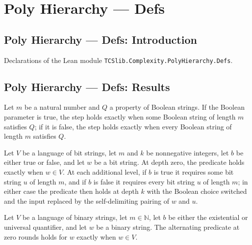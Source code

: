\section{Poly Hierarchy --- Defs}
\subsection*{Poly Hierarchy --- Defs: Introduction}

Declarations of the Lean module \texttt{TCSlib.Complexity.PolyHierarchy.Defs}.

\subsection*{Poly Hierarchy --- Defs: Results}

\begin{definition}
\label{Complexity.qStep}
\leanok
Let $m$ be a natural number and $Q$ a property of Boolean strings. If the Boolean
parameter is true, the step holds exactly when some Boolean string of length $m$
satisfies $Q$; if it is false, the step holds exactly when every Boolean string of
length $m$ satisfies $Q$.
\end{definition}

\begin{definition}
\label{Complexity.altQuant}
\leanok
{}
Let $V$ be a language of bit strings, let $m$ and $k$ be nonnegative integers, let $b$
be either true or false, and let $w$ be a bit string. At depth zero, the predicate holds
exactly when $w\in V$. At each additional level, if $b$ is true it requires some bit
string $u$ of length $m$, and if $b$ is false it requires every bit string $u$ of length
$m$; in either case the predicate then holds at depth $k$ with the Boolean choice
switched and the input replaced by the self-delimiting pairing of $w$ and $u$.
\end{definition}

\begin{theorem}
\label{Complexity.altQuant_zero}
\leanok
{}
Let $V$ be a language of binary strings, let $m\in\mathbb{N}$, let $b$ be either the
existential or universal quantifier, and let $w$ be a binary string. The alternating
predicate at zero rounds holds for $w$ exactly when $w\in V$.
\end{theorem}

